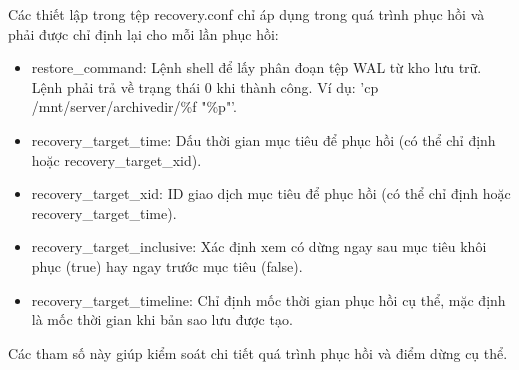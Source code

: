 \begin{enumerate}
\begin{enumerate}
        \hspace{1cm}Các thiết lập trong tệp recovery.conf chỉ áp dụng trong quá trình phục hồi và phải được chỉ định lại cho mỗi lần phục hồi:
        \begin{itemize}
            \item restore\_command: Lệnh shell để lấy phân đoạn tệp WAL từ kho lưu trữ. Lệnh phải trả về trạng thái 0 khi thành công. Ví dụ: 'cp /mnt/server/archivedir/\%f "\%p"'.
            \item recovery\_target\_time: Dấu thời gian mục tiêu để phục hồi (có thể chỉ định hoặc recovery\_target\_xid).
            \item recovery\_target\_xid: ID giao dịch mục tiêu để phục hồi (có thể chỉ định hoặc recovery\_target\_time).
            \item recovery\_target\_inclusive: Xác định xem có dừng ngay sau mục tiêu khôi phục (true) hay ngay trước mục tiêu (false).
            \item recovery\_target\_timeline: Chỉ định mốc thời gian phục hồi cụ thể, mặc định là mốc thời gian khi bản sao lưu được tạo.
        \end{itemize}
        \hspace{1cm} Các tham số này giúp kiểm soát chi tiết quá trình phục hồi và điểm dừng cụ thể.
    \end{enumerate}
\end{enumerate}
